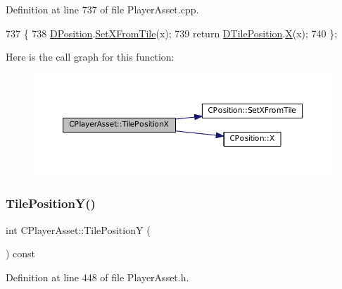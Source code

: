 Definition at line 737 of file Player\+Asset.\+cpp.


\begin{DoxyCode}
737                                     \{
738     \hyperlink{classCPlayerAsset_aa9f53c009b181c7c5647c6b03776a04c}{DPosition}.\hyperlink{classCPosition_ac6a1eeaeb98e20942efea7cf253b2ec4}{SetXFromTile}(x);
739     \textcolor{keywordflow}{return} \hyperlink{classCPlayerAsset_a5b59a9d3b7db8c7fa194b80dafb96186}{DTilePosition}.\hyperlink{classCPosition_a9a6b94d3b91df1492d166d9964c865fc}{X}(x);
740 \};
\end{DoxyCode}
Here is the call graph for this function\+:
\nopagebreak
\begin{figure}[H]
\begin{center}
\leavevmode
\includegraphics[width=350pt]{classCPlayerAsset_ad3a0b4bafbfa9021b59925a5c3364cd5_cgraph}
\end{center}
\end{figure}
\hypertarget{classCPlayerAsset_a189adb25bf0a45117a9c0bb36b45e6a4}{}\label{classCPlayerAsset_a189adb25bf0a45117a9c0bb36b45e6a4} 
\subsubsection{\texorpdfstring{Tile\+Position\+Y()}{TilePositionY()}\hspace{0.1cm}{\footnotesize\ttfamily [1/2]}}
{\footnotesize\ttfamily int C\+Player\+Asset\+::\+Tile\+PositionY (\begin{DoxyParamCaption}{ }\end{DoxyParamCaption}) const\hspace{0.3cm}{\ttfamily [inline]}}



Definition at line 448 of file Player\+Asset.\+h.


